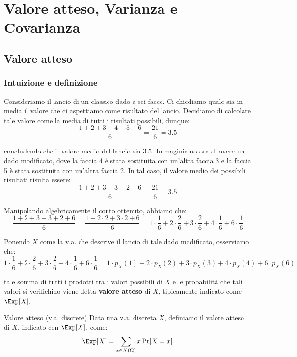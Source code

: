 \documentclass[a4paper, 12pt]{report}
\begin{document}
    \chapter{Valore atteso, Varianza e Covarianza}

    \section{Valore atteso}

    \subsection{Intuizione e definizione}

    Consideriamo il lancio di un classico dado a sei facce. Ci chiediamo quale sia in media il valore che ci aspettiamo come risultato del lancio. Decidiamo di calcolare tale valore come la media di tutti i risultati possibili, dunque:
    \[\frac{1+2+3+4+5+6}{6} = \frac{21}{6} = 3.5\]

    concludendo che il valore medio del lancio sia $3.5$. Immaginiamo ora di avere un dado modificato, dove la faccia 4 è stata sostituita con un'altra faccia 3 e la faccia 5 è stata sostituita con un'altra faccia 2. In tal caso, il valore medio dei possibili risultati risulta essere:
    \[\frac{1+2+3+3+2+6}{6} = \frac{21}{6} = 3.5\]

    Manipolando algebricamente il conto ottenuto, abbiamo che:
    \[\frac{1+2+3+3+2+6}{6} = \frac{1+2 \cdot 2 + 3 \cdot 2 + 6}{6} = 1 \cdot \frac{1}{6} + 2 \cdot \frac{2}{6} + 3 \cdot \frac{2}{6} + 4 \cdot \frac{1}{6} + 6 \cdot \frac{1}{6}\]

    Ponendo $X$ come la v.a. che descrive il lancio di tale dado modificato, osserviamo che:
    \[1 \cdot \frac{1}{6} + 2 \cdot \frac{2}{6} + 3 \cdot \frac{2}{6} + 4 \cdot \frac{1}{6} + 6 \cdot \frac{1}{6} = 1 \cdot p_X(1) + 2 \cdot p_X(2) + 3 \cdot p_X(3) + 4 \cdot p_X(4) + 6 \cdot p_X(6)\]

    tale somma di tutti i prodotti tra i valori possibili di $X$ e le probabilità che tali valori si verifichino viene detta \textbf{valore atteso} di $X$, tipicamente indicato come $\Exp[X]$.

    \begin{frameddefn}{Valore atteso (v.a. discrete)}
        Data una v.a. discreta $X$, definiamo il valore atteso di $X$, indicato con $\Exp[X]$, come:
        \[\Exp[X] = \sum\limits_{x \in X(\Omega)} x \Pr[X = x]\]
    \end{frameddefn}
\end{document}

